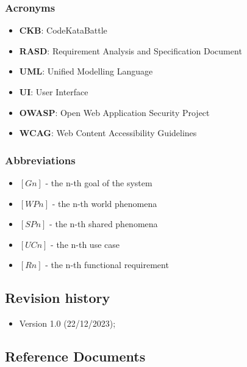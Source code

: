\vspace{12pt}

\subsubsection{Acronyms}
\begin{itemize}
    \item \textbf{CKB}: CodeKataBattle
    \item \textbf{RASD}: Requirement Analysis and Specification Document
    \item \textbf{UML}: Unified Modelling Language
    \item \textbf{UI}: User Interface
    \item \textbf{OWASP}: Open Web Application Security Project
    \item \textbf{WCAG}: Web Content Accessibility Guidelines
\end{itemize}

\vspace{12pt}

\subsubsection{Abbreviations}
\begin{itemize}
    \item $[Gn]$ - the n-th goal of the system
    \item $[WPn]$ - the n-th world phenomena
    \item $[SPn]$ - the n-th shared phenomena
    \item $[UCn]$ - the n-th use case
    \item $[Rn]$ - the n-th functional requirement
\end{itemize}

\vspace{24pt}

\subsection{Revision history}
\begin{itemize}
    \item Version 1.0 (22/12/2023);
\end{itemize}

\vspace{24pt}

\subsection{Reference Documents}

